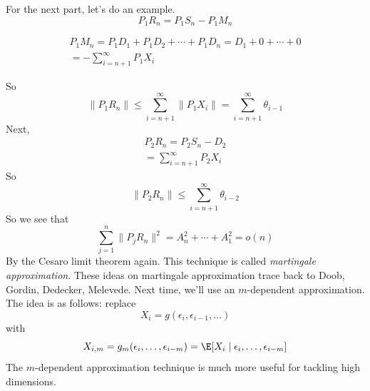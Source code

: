 For the next part, let's do an example.
\[P_1 R_n = P_1 S_n - P_1 M_n\]

\[\begin{gathered}P_1 M_n = P_1 D_1 + P_1 D_2 + \cdots + P_1 D_n = D_1 + 0 + \cdots + 0 \\
= -\sum_{i=n+1}^\infty P_1 X_i\end{gathered}\]

So
\[\|P_1 R_n\| \leq \sum_{i=n+1}^\infty \|P_1 X_i\| = \sum_{i=n+1}^\infty \theta_{i-1}\]
Next,
\[\begin{gathered}P_2 R_n = P_2 S_n - D_2 \\
= \sum_{i=n+1}^\infty P_2 X_i\end{gathered}\]
So
\[\|P_2 R_n\| \leq \sum_{i=n+1}^\infty \theta_{i-2}\]
So we see that
\[\sum_{j=1}^n \|P_j R_n\|^2 = A_n^2 + \cdots + A_1^2 = o(n)\]
By the Cesaro limit theorem again. This technique is called \emph{martingale approximation}. These ideas on martingale approximation trace back to Doob, Gordin, Dedecker, Melevede. Next time, we'll use an \(m\)-dependent approximation. The idea is as follows: replace
\[X_i = g(\epsilon_i, \epsilon_{i-1}, \dots)\]
with
\[X_{i,m} = g_m(\epsilon_i, \dots, \epsilon_{i-m}) = \E[X_i \mid \epsilon_i, \dots, \epsilon_{i-m}]\]
The \(m\)-dependent approximation technique is much more useful for tackling high dimensions.
